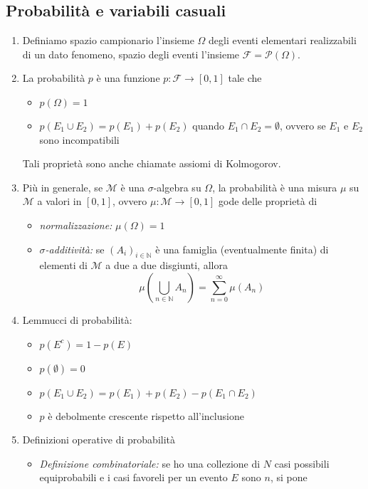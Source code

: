 \documentclass[a4paper,11pt]{article}
\begin{document}
\subsection{Probabilità e variabili casuali}
\begin{enumerate}[resume]
	\item Definiamo spazio campionario l'insieme $\Omega$ degli eventi elementari realizzabili di un dato fenomeno, spazio degli eventi l'insieme $\mathcal{F}=\mathcal{P}\left(\Omega\right)$.
	\item La probabilità $p$ è una funzione $p\colon\mathcal{F}\to[0,1]$ tale che
	\begin{itemize}
		\item $p(\Omega)=1$
		\item $p(E_1\cup E_2)=p(E_1)+p(E_2)$ quando $E_1\cap E_2=\emptyset$, ovvero se $E_1$ e $E_2$ sono incompatibili
	\end{itemize}
	Tali proprietà sono anche chiamate assiomi di Kolmogorov.
	\item Più in generale, se $\mathcal{M}$ è una $\sigma$-algebra su $\Omega$, la probabilità è una misura $\mu$ su $\mathcal{M}$ a valori in $[0,1]$, ovvero $\mu\colon\mathcal{M}\to[0,1]$ gode delle proprietà di
	\begin{itemize}
		\item \textit{normalizzazione:} $\mu\left(\Omega\right)=1$
		\item \textit{$\sigma$-additività:} se $\left(A_i\right)_{i\in\mathbb{N}}$ è una famiglia (eventualmente finita) di elementi di $\mathcal{M}$ a due a due disgiunti, allora \[\mu\left(\bigcup_{n\in\mathbb{N}}A_n\right)=\sum_{n=0}^{\infty}\mu\left(A_n\right)\]
	\end{itemize}
	\item Lemmucci di probabilità:
	\begin{itemize}
		\item $p(E^c)=1-p(E)$
		\item $p(\emptyset)=0$
		\item $p(E_1\cup E_2)=p(E_1)+p(E_2)-p(E_1\cap E_2)$
		\item $p$ è debolmente crescente rispetto all'inclusione
	\end{itemize}
	\item Definizioni operative di probabilità
	\begin{itemize}
		\item \textit{Definizione combinatoriale:} se ho una collezione di $N$ casi possibili equiprobabili e i casi favoreli per un evento $E$ sono $n$, si pone

\end{itemize}
\end{enumerate}
\end{document}
